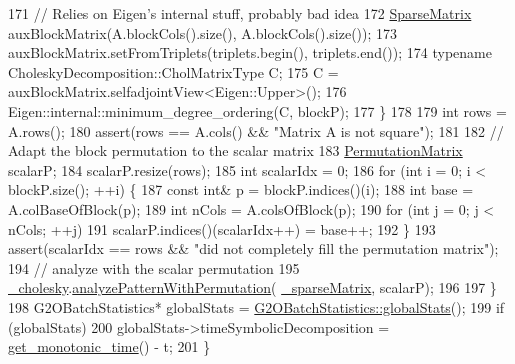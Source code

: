 \begin{DoxyCode}
171           \textcolor{comment}{// Relies on Eigen's internal stuff, probably bad idea}
172           \hyperlink{classg2o_1_1LinearSolverEigen_aeb7e2400bed3a249b5f29ce7cc00cd33}{SparseMatrix} auxBlockMatrix(A.blockCols().size(), A.blockCols().size());
173           auxBlockMatrix.setFromTriplets(triplets.begin(), triplets.end());
174           \textcolor{keyword}{typename} CholeskyDecomposition::CholMatrixType C;
175           C = auxBlockMatrix.selfadjointView<Eigen::Upper>();
176           Eigen::internal::minimum\_degree\_ordering(C, blockP);
177         \}
178 
179         \textcolor{keywordtype}{int} rows = A.rows();
180         assert(rows == A.cols() && \textcolor{stringliteral}{"Matrix A is not square"});
181 
182         \textcolor{comment}{// Adapt the block permutation to the scalar matrix}
183         \hyperlink{classg2o_1_1LinearSolverEigen_a86afb924e2b1d3ebd9b9d4a318eded44}{PermutationMatrix} scalarP;
184         scalarP.resize(rows);
185         \textcolor{keywordtype}{int} scalarIdx = 0;
186         \textcolor{keywordflow}{for} (\textcolor{keywordtype}{int} i = 0; i < blockP.size(); ++i) \{
187           \textcolor{keyword}{const} \textcolor{keywordtype}{int}& p = blockP.indices()(i);
188           \textcolor{keywordtype}{int} base  = A.colBaseOfBlock(p);
189           \textcolor{keywordtype}{int} nCols = A.colsOfBlock(p);
190           \textcolor{keywordflow}{for} (\textcolor{keywordtype}{int} j = 0; j < nCols; ++j)
191             scalarP.indices()(scalarIdx++) = base++;
192         \}
193         assert(scalarIdx == rows && \textcolor{stringliteral}{"did not completely fill the permutation matrix"});
194         \textcolor{comment}{// analyze with the scalar permutation}
195         \hyperlink{classg2o_1_1LinearSolverEigen_ab7205de4c6820b3ecd7ed7f39bbdf573}{\_cholesky}.\hyperlink{classg2o_1_1LinearSolverEigen_1_1CholeskyDecomposition_a3aa432f9aec0b7230c733df9a4d80558}{analyzePatternWithPermutation}(
      \hyperlink{classg2o_1_1LinearSolverEigen_a39682995a9cf32dc79848281c6d4d9b9}{\_sparseMatrix}, scalarP);
196 
197       \}
198       G2OBatchStatistics* globalStats = \hyperlink{structg2o_1_1G2OBatchStatistics_a06f9c667d8b48b8f0023e27011818b64}{G2OBatchStatistics::globalStats}();
199       \textcolor{keywordflow}{if} (globalStats)
200         globalStats->timeSymbolicDecomposition = \hyperlink{namespaceg2o_aa64237935c7d8411b4369234a5f661ea}{get\_monotonic\_time}() - t;
201     \}
\end{DoxyCode}
